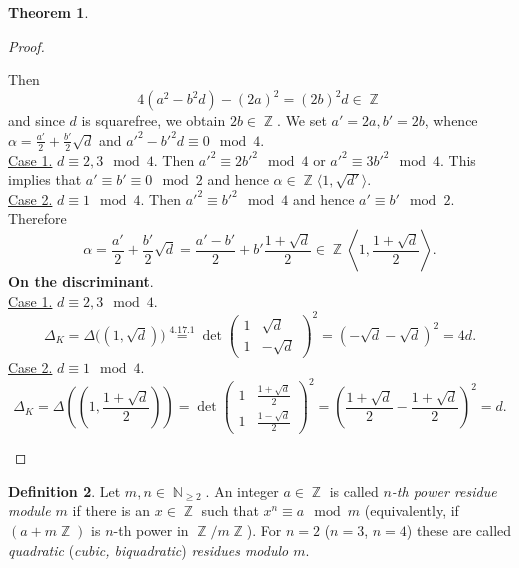 \documentclass[12pt,a4paper]{report}
\theoremstyle{definition}
\newtheorem{theorem}{Theorem}[chapter] %
\newtheorem{defn}[theorem]{Definition}
\theoremstyle{num.custom-title}
\DeclareMathOperator{\N}{\mathbb{N}}
\DeclareMathOperator{\Z}{\mathbb{Z}}
\begin{document}
\begin{theorem}
\begin{proof}
\begin{enumerate}
Then
\[
4(a^2-b^2d)-(2a)^2 = (2b)^2 d \in \Z
\]
and since $d$ is squarefree, we obtain $2b \in \Z$. We set $a'=2a,b'=2b$, whence $\alpha= \frac{a'}{2} + \frac{b'}{2}\sqrt{d}$ and $a'^2-b'^2d \equiv 0 \mod 4$.\\
\underline{Case 1.} $d \equiv 2,3 \mod 4$. Then $a'^2 \equiv 2b'^2 \mod 4$ or $a'^2 \equiv 3b'^2 \mod 4$. This implies that $a' \equiv b' \equiv 0 \mod 2$ and hence $\alpha \in \Z \langle 1, \sqrt{d'} \rangle$.\\
\underline{Case 2.} $d \equiv 1 \mod 4$. Then $a'^2 \equiv b'^2 \mod 4$ and hence $a' \equiv b' \mod 2$. Therefore
\[
\alpha = \frac{a'}{2}+\frac{b'}{2} \sqrt{d} = \frac{a'-b'}{2} + b' \frac{1+\sqrt{d}}{2} \in \Z \left\langle 1, \frac{1+\sqrt{d}}{2} \right\rangle.
\]
\textbf{On the discriminant}.\\
\underline{Case 1.} $d \equiv 2,3 \mod 4$.
\[
\Delta_K = \Delta \Big( (1,\sqrt{d}) \Big) \stackrel{4.17.1}{=} \det 
\begin{pmatrix}
1 & \sqrt{d} \\
1 & -\sqrt{d}
\end{pmatrix}^2
= (-\sqrt{d} -\sqrt{d})^2 = 4d.
\]
\underline{Case 2.} $d \equiv 1 \mod 4$.
\[
\Delta_K = \Delta \left( \left( 1,\frac{1+\sqrt{d}}{2} \right) \right) = \det 
\begin{pmatrix}
1 & \frac{1+\sqrt{d}}{2} \\
1 & \frac{1-\sqrt{d}}{2}
\end{pmatrix}^2
= \left( \frac{1+\sqrt{d}}{2} - \frac{1+\sqrt{d}}{2} \right)^2 = d.
\]
\end{enumerate}
\end{proof}
\end{theorem}

\begin{defn}
Let $m,n \in \N_{\geq 2}$. An integer $a \in \Z$ is called \emph{$n$-th power residue module $m$} if there is an $x \in \Z$ such that $x^n \equiv a \mod m$ (equivalently, if $(a+m\Z)$ is $n$-th power in $\Z/m\Z$). For $n=2$ ($n=3$, $n=4$) these are called \emph{quadratic} (\emph{cubic, biquadratic}) \emph{residues modulo $m$}.
\end{defn}
\end{document}
